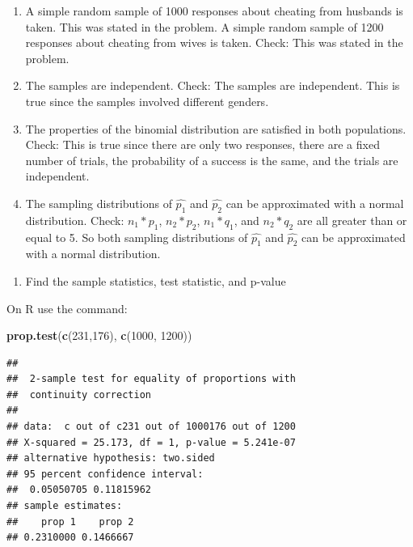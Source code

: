 \documentclass[
]{book}
\newenvironment{Shaded}{\begin{snugshade}}{\end{snugshade}}
\newcommand{\DecValTok}[1]{\textcolor[rgb]{0.00,0.00,0.81}{#1}}
\newcommand{\KeywordTok}[1]{\textcolor[rgb]{0.13,0.29,0.53}{\textbf{#1}}}
\newcommand{\NormalTok}[1]{#1}
\providecommand{\tightlist}{%
  \setlength{\itemsep}{0pt}\setlength{\parskip}{0pt}}
\begin{document}
\begin{enumerate}
\def\labelenumi{\alph{enumi}.}
\item
  A simple random sample of 1000 responses about cheating from husbands is taken. This was stated in the problem. A simple random sample of 1200 responses about cheating from wives is taken. Check: This was stated in the problem.
\item
  The samples are independent. Check: The samples are independent. This is true since the samples involved different genders.
\item
  The properties of the binomial distribution are satisfied in both populations. Check: This is true since there are only two responses, there are a fixed number of trials, the probability of a success is the same, and the trials are independent.
\item
  The sampling distributions of \(\hat{p_1}\) and \(\hat{p_2}\) can be approximated with a normal distribution. Check: \(n_1*p_1\), \(n_2*p_2\), \(n_1*q_1\), and \(n_2*q_2\) are all greater than or equal to 5. So both sampling distributions of \(\hat{p_1}\) and \(\hat{p_2}\) can be approximated with a normal distribution.
\end{enumerate}

\begin{enumerate}
\def\labelenumi{\arabic{enumi}.}
\setcounter{enumi}{3}
\tightlist
\item
  Find the sample statistics, test statistic, and p-value
\end{enumerate}

On R use the command:

\begin{Shaded}
\begin{Highlighting}[]
\KeywordTok{prop.test}\NormalTok{(}\KeywordTok{c}\NormalTok{(}\DecValTok{231}\NormalTok{,}\DecValTok{176}\NormalTok{), }\KeywordTok{c}\NormalTok{(}\DecValTok{1000}\NormalTok{, }\DecValTok{1200}\NormalTok{))}
\end{Highlighting}
\end{Shaded}

\begin{verbatim}
## 
##  2-sample test for equality of proportions with
##  continuity correction
## 
## data:  c out of c231 out of 1000176 out of 1200
## X-squared = 25.173, df = 1, p-value = 5.241e-07
## alternative hypothesis: two.sided
## 95 percent confidence interval:
##  0.05050705 0.11815962
## sample estimates:
##    prop 1    prop 2 
## 0.2310000 0.1466667
\end{verbatim}
\end{document}
